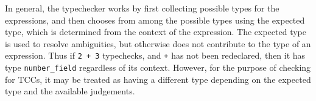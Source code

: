 In general, the typechecker works by first collecting possible types for
the expressions, and then chooses from among the possible types using the
expected type, which is determined from the context of the expression.
The expected type is used to resolve ambiguities, but otherwise does not
contribute to the type of an expression.  Thus if \texttt{2 + 3}
typechecks, and \texttt{+} has not been redeclared, then it has type
\texttt{number\_field} regardless of its context.  However, for the purpose
of checking for TCCs, it may be treated as having a different type
depending on the expected type and the available judgements.
